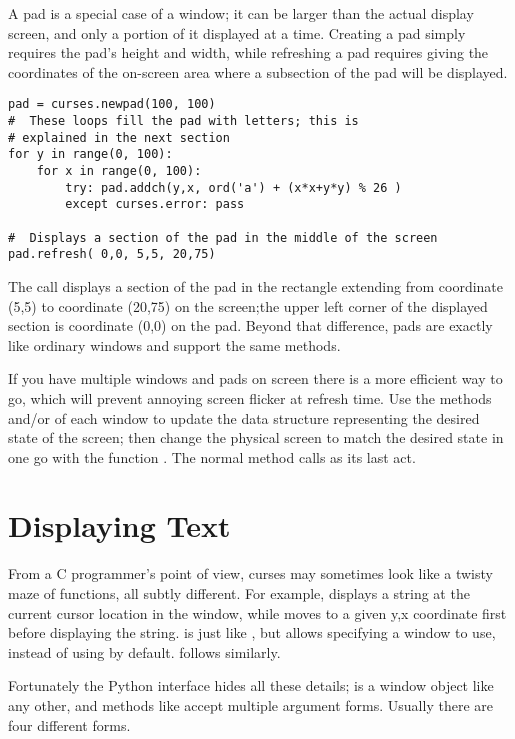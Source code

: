 \documentclass{howto}
\begin{document}
A pad is a special case of a window; it can be larger than the actual
display screen, and only a portion of it displayed at a time.
Creating a pad simply requires the pad's height and width, while
refreshing a pad requires giving the coordinates of the on-screen
area where a subsection of the pad will be displayed.  

\begin{verbatim}
pad = curses.newpad(100, 100)
#  These loops fill the pad with letters; this is
# explained in the next section
for y in range(0, 100):
    for x in range(0, 100):
        try: pad.addch(y,x, ord('a') + (x*x+y*y) % 26 )
        except curses.error: pass

#  Displays a section of the pad in the middle of the screen
pad.refresh( 0,0, 5,5, 20,75)
\end{verbatim}

The  call displays a section of the pad in the
rectangle extending from coordinate (5,5) to coordinate (20,75) on the
screen;the upper left corner of the displayed section is coordinate
(0,0) on the pad.  Beyond that difference, pads are exactly like
ordinary windows and support the same methods.

If you have multiple windows and pads on screen there is a more
efficient way to go, which will prevent annoying screen flicker at
refresh time.  Use the methods  and/or
 of each window to update the data structure
representing the desired state of the screen; then change the physical
screen to match the desired state in one go with the function
.  The normal  method calls
 as its last act.

\section{Displaying Text}

{}From a C programmer's point of view, curses may sometimes look like
a twisty maze of functions, all subtly different.  For example,
 displays a string at the current cursor location
in the  window, while  moves to a
given y,x coordinate first before displaying the string.
 is just like , but allows
specifying a window to use, instead of using  by default.
 follows similarly.

Fortunately the Python interface hides all these details;
 is a window object like any other, and methods like
 accept multiple argument forms.  Usually there are
four different forms.
\end{document}
